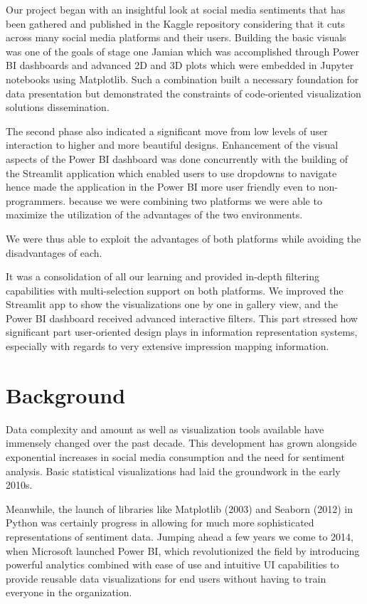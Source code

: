\documentclass[conference]{IEEEtran}
\begin{document}
Our project began with an insightful look at social media sentiments that has been gathered and published in the Kaggle repository considering that it cuts across many social media platforms and their users. Building the basic visuals was one of the goals of stage one Jamian which was accomplished through Power BI dashboards and advanced 2D and 3D plots which were embedded in Jupyter notebooks using Matplotlib. Such a combination built a necessary foundation for data presentation but demonstrated the constraints of code-oriented visualization solutions dissemination.  

The second phase also indicated a significant move from low levels of user interaction to higher and more beautiful designs. Enhancement of the visual aspects of the Power BI dashboard was done concurrently with the building of the Streamlit application which enabled users to use dropdowns to navigate hence made the application in the Power BI more user friendly even to non-programmers. because we were combining two platforms we were able to maximize the utilization of the advantages of the two environments.

We were thus able to exploit the advantages of both platforms while avoiding the disadvantages of each.

It was a consolidation of all our learning and provided in-depth filtering capabilities with multi-selection support on both platforms. We improved the Streamlit app to show the visualizations one by one in gallery view, and the Power BI dashboard received advanced interactive filters. This part stressed how significant part user-oriented design plays in information representation systems, especially with regards to very extensive impression mapping information.

\section{Background}

Data complexity and amount as well as visualization tools available have immensely changed over the past decade. This development has grown alongside exponential increases in social media consumption and the need for sentiment analysis. Basic statistical visualizations had laid the groundwork in the early 2010s. 

Meanwhile, the launch of libraries like Matplotlib (2003) and Seaborn (2012) in Python was certainly progress in allowing for much more sophisticated representations of sentiment data. Jumping ahead a few years we come to 2014, when Microsoft launched Power BI, which revolutionized the field by introducing powerful analytics combined with ease of use and intuitive UI capabilities to provide reusable data visualizations for end users without having to train everyone in the organization.
\end{document}
